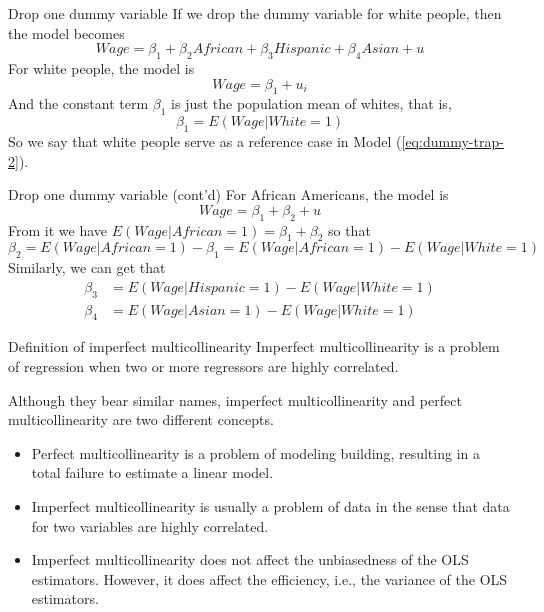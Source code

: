 \documentclass[presentation,10pt]{beamer}
\begin{document}
\begin{frame}[label={sec:org9feff6c}]{Drop one dummy variable}
If we drop the dummy variable for white people, then the model becomes
\begin{equation}
\label{eq:dummy-trap-2}
Wage = \beta_1 + \beta_2 African + \beta_3 Hispanic + \beta_4 Asian + u
\end{equation}
For white people, the model is
\[Wage = \beta_1 + u_i \]
And the constant term \(\beta_1\) is just the population mean of
whites, that is,
\[\beta_1 = E(Wage | White = 1)\]
So we say that white people
serve as a reference case in Model (\ref{eq:dummy-trap-2}).
\end{frame}

\begin{frame}[label={sec:orga0c5efa}]{Drop one dummy variable (cont'd)}
For African Americans, the model is
\[ Wage = \beta_1 + \beta_2 + u  \]
From it we have \(E(Wage | African=1) = \beta_1 + \beta_2\) so that
\[\beta_2 = E(Wage | African = 1) - \beta_1 = E(Wage | African = 1) -
E(Wage | White = 1)\]
Similarly, we can get that
\begin{align*}
\beta_3 &= E(Wage | Hispanic = 1) - E(Wage | White = 1) \\
\beta_4 &= E(Wage | Asian = 1) - E(Wage | White = 1)
\end{align*}
\end{frame}

\begin{frame}[label={sec:org55f3dbc}]{Definition of imperfect multicollinearity}
\alert{Imperfect multicollinearity} is a problem of regression when two or
more regressors are highly correlated.

\vspace{0.3cm}
Although they bear similar
names, imperfect multicollinearity and perfect multicollinearity are
two different concepts.
\begin{itemize}
\item Perfect multicollinearity is a problem of modeling building,
resulting in a total failure to estimate a linear model.
\item Imperfect multicollinearity is usually a problem of data in the
sense that data for two variables are highly correlated.
\item Imperfect multicollinearity does not affect the unbiasedness of the
OLS estimators. However, it does affect the efficiency, i.e., the
variance of the OLS estimators.
\end{itemize}
\end{frame}
\end{document}
